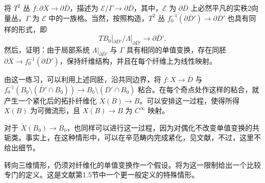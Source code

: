 \begin{exercise}\label{exer:6.94}
将 $T^2$ 丛 $\overline f\colon\partial\overline X\to\partial\overline D$，描述为 $\mathcal E/\Gamma\to\partial\overline D$，其中，$\mathcal E$ 为 $\partial\overline D$ 上必然平凡的实秩2向量丛，$\Gamma$ 为 $\mathcal E$ 中的一族格。当然，按照构造，$T^2$ 丛 $f_0^{-1}(\partial\overline D')\to\partial\overline D'$ 也具有同样的形式，即
\[
TB_0|_{\partial\overline D'}/\Lambda|_{\partial\overline D'}
\longrightarrow\partial\overline D'.
\]
然后，证明：由于局部系统 $\Lambda|_{\partial\overline D'}$ 与 $\Gamma$ 具有相同的单值变换，存在同胚 $\partial\overline X\to f_0^{-1}(\partial\overline D')$，保持纤维结构，并且在每个纤维上为线性映射。
\end{exercise}

由这一练习，可以利用上述同胚，沿共同边界，将 $\overline f\colon\overline X\to\overline D$ 与 $f_0^{-1}(B_0\setminus(\overline D'\cap B_0))\to B_0\setminus(\overline D'\cap B_0)$ 粘合。在每个奇点处作这样的粘合，就产生一个紧化后的拓扑纤维化 $X(B)\to B$。可以安排这一过程，使得所得 $X(B)$ 为可微流形，且 $X(B)\to B$ 为 $C^\infty$ 映射。

对于 $\check X(B_0)\to B_0$，也同样可以进行这一过程，因为对偶化不改变单值变换的共轭类。事实上，在这种情形中，可以在辛范畴内完成紧化，见文献，不过，这里不给出细节。

转向三维情形，仍须对纤维化的单值变换作一个假设。将为这一限制给出一个比较专门的定义。这是文献第1.5节中一个更一般定义的特殊情形。

